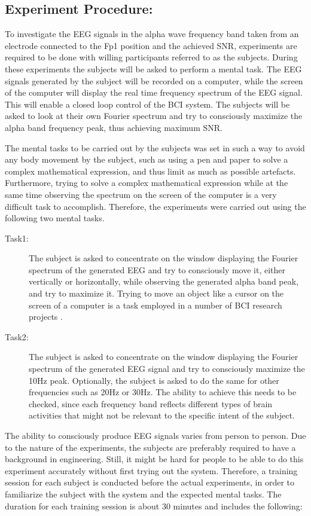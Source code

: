 \subsection{\bf{Experiment Procedure:}}
To investigate the EEG signals in the alpha wave frequency band taken from an electrode connected to the Fp1 position and the achieved SNR, experiments are required to be done with willing participants referred to as the subjects. During these experiments the subjects will be asked to perform a mental task. The EEG signals generated by the subject will be recorded on a computer, while the screen of the computer will display the real time frequency spectrum of the EEG signal. This will enable a closed loop control of the BCI system. The subjects will be asked to look at their own Fourier spectrum and try to consciously maximize the alpha band frequency peak, thus achieving maximum SNR.  

The mental tasks to be carried out by the subjects was set in such a way to avoid any body movement by the subject, such as using a pen and paper to solve a complex mathematical expression, and thus limit as much as possible artefacts. Furthermore, trying to solve a complex mathematical expression while at the same time observing the spectrum on the screen of the computer is a very difficult task to accomplish. Therefore, the experiments were carried out using the following two mental tasks. 

\begin{description}
 	\item[Task1:] 	The subject is asked to concentrate on the window displaying the Fourier spectrum of the generated EEG and try to consciously move it, either vertically or horizontally, while observing the generated alpha band peak, and try to maximize it. Trying to move an object like a cursor on the screen of a computer is a task employed in a number of BCI research projects  \citep{Wolpaw2004}. 
	\item[Task2:]	The subject is asked to concentrate on the window displaying the Fourier spectrum of the generated EEG signal and try to consciously maximize the 10Hz peak. Optionally, the subject is asked to do the same for other frequencies such as 20Hz or 30Hz. The ability to achieve this needs to be checked, since each frequency band reflects different types of brain activities that might not be relevant to the specific intent of the subject.    
\end{description}

The ability to consciously produce EEG signals varies from person to person. Due to the nature of the experiments, the subjects are preferably required to have a background in engineering. Still, it might be hard for people to be able to do this experiment accurately without first trying out the system. Therefore, a training session for each subject is conducted before the actual experiments, in order to familiarize the subject with the system and the expected mental tasks. The duration for each training session is about 30 minutes and includes the following:

